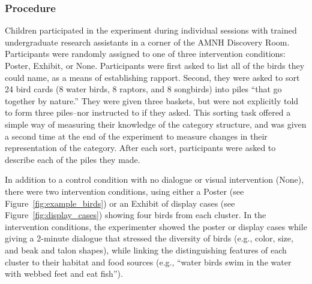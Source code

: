 \documentclass[10pt,letterpaper]{article}
\begin{document}
\subsubsection{Procedure}

Children participated in the experiment during individual sessions with trained undergraduate research assistants in a corner of the AMNH Discovery Room. Participants were randomly assigned to one of three intervention conditions: Poster, Exhibit, or None.
Participants were first asked to list all of the birds they could name, as a means of establishing rapport. 
Second, they were asked to sort 24 bird cards (8 water birds, 8 raptors, and 8 songbirds) into piles ``that go together by nature.'' They were given three baskets, but were not explicitly told to form three piles--nor instructed to if they asked.
This sorting task offered a simple way of measuring their knowledge of the category structure, and was given a second time at the end of the experiment to measure changes in their representation of the category.
After each sort, participants were asked to describe each of the piles they made.

In addition to a control condition with no dialogue or visual intervention (None), there were two intervention conditions, using either a Poster (see Figure~\ref{fig:example_birds}) or an Exhibit of display cases (see Figure~\ref{fig:display_cases}) showing four birds from each cluster.  
In the intervention conditions, the experimenter showed the poster or display cases while giving a 2-minute dialogue that stressed the diversity of birds (e.g., color, size, and beak and talon shapes), while linking the distinguishing features of each cluster to their habitat and food sources (e.g., ``water birds swim in the water with webbed feet and eat fish'').
\end{document}

